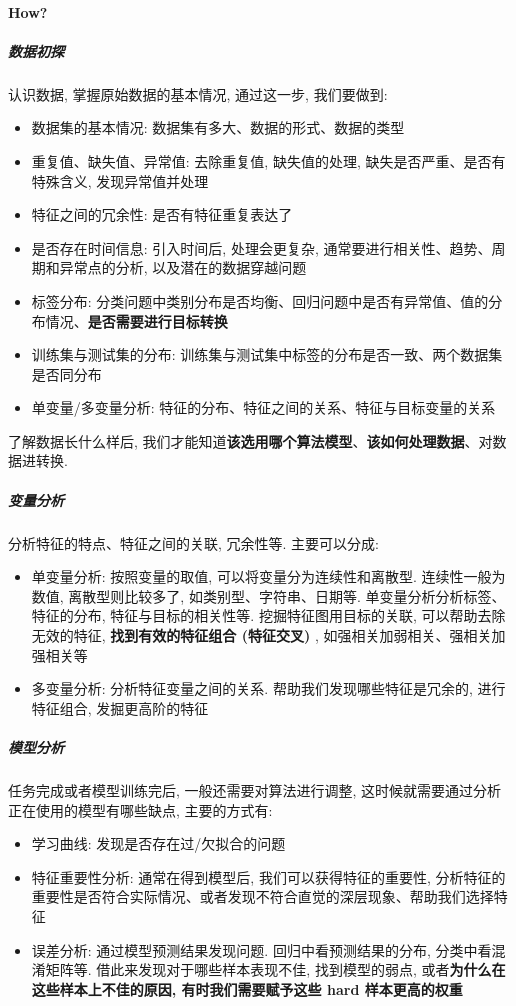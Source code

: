 \paragraph{How?}
\subparagraph{数据初探}认识数据, 掌握原始数据的基本情况, 通过这一步, 我们要做到: 
\begin{itemize}
	\item 数据集的基本情况: 数据集有多大、数据的形式、数据的类型
	\item 重复值、缺失值、异常值: 去除重复值, 缺失值的处理, 缺失是否严重、是否有特殊含义, 发现异常值并处理
	\item 特征之间的冗余性: 是否有特征重复表达了
	\item 是否存在时间信息: 引入时间后, 处理会更复杂, 通常要进行相关性、趋势、周期和异常点的分析, 以及潜在的数据穿越问题
	\item 标签分布: 分类问题中类别分布是否均衡、回归问题中是否有异常值、值的分布情况、\textbf{是否需要进行目标转换}
	\item 训练集与测试集的分布: 训练集与测试集中标签的分布是否一致、两个数据集是否同分布
	\item 单变量/多变量分析: 特征的分布、特征之间的关系、特征与目标变量的关系
\end{itemize}
了解数据长什么样后, 我们才能知道\textbf{该选用哪个算法模型}、\textbf{该如何处理数据}、对数据进转换. 

\subparagraph{变量分析}分析特征的特点、特征之间的关联, 冗余性等. 主要可以分成: 
\begin{itemize}
	\item 单变量分析: 按照变量的取值, 可以将变量分为连续性和离散型. 连续性一般为数值, 离散型则比较多了, 如类别型、字符串、日期等. 单变量分析分析标签、特征的分布, 特征与目标的相关性等. 挖掘特征图用目标的关联, 可以帮助去除无效的特征, \textbf{找到有效的特征组合 (特征交叉) }, 如强相关加弱相关、强相关加强相关等
	
	\item 多变量分析: 分析特征变量之间的关系. 帮助我们发现哪些特征是冗余的, 进行特征组合, 发掘更高阶的特征
\end{itemize}

\subparagraph{模型分析}任务完成或者模型训练完后, 一般还需要对算法进行调整, 这时候就需要通过分析正在使用的模型有哪些缺点, 主要的方式有: 
\begin{itemize}
	\item 学习曲线: 发现是否存在过/欠拟合的问题
	\item 特征重要性分析: 通常在得到模型后, 我们可以获得特征的重要性, 分析特征的重要性是否符合实际情况、或者发现不符合直觉的深层现象、帮助我们选择特征
	\item 误差分析: 通过模型预测结果发现问题. 回归中看预测结果的分布, 分类中看混淆矩阵等. 借此来发现对于哪些样本表现不佳, 找到模型的弱点, 或者\textbf{为什么在这些样本上不佳的原因, 有时我们需要赋予这些 hard 样本更高的权重}
\end{itemize}





